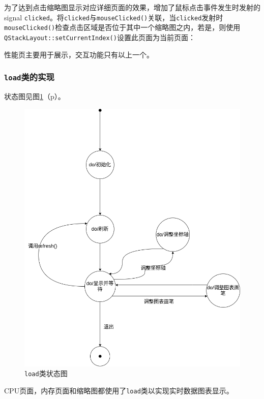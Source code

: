 \documentclass[UTF8,twoside,titlepage]{ctexart}
\newcommand\code[1]{\texttt{#1}}
\newcommand\myref[1]{\ref{#1}（p\pageref{#1}）}
\begin{document}
为了达到点击缩略图显示对应详细页面的效果，增加了鼠标点击事件发生时发射的signal \code{clicked}。将\code{clicked}与\code{mouseClicked()}关联，当\code{clicked}发射时\code{mouseClicked()}检查点击区域是否位于其中一个缩略图之内，若是，则使用\code{QStackLayout::setCurrentIndex()}设置此页面为当前页面：

{
    \ttfamily
    
}

性能页主要用于展示，交互功能只有以上一个。

\subsubsection{\code{load}类的实现}
状态图见图\myref{fig:loadstat}。

\begin{figure}[htb]
    \centering
    \includegraphics[scale=0.4]{../dia/load.png}
    \caption{\code{load}类状态图}
    \label{fig:loadstat}
\end{figure}

CPU页面，内存页面和缩略图都使用了\code{load}类以实现实时数据图表显示。
\end{document}
